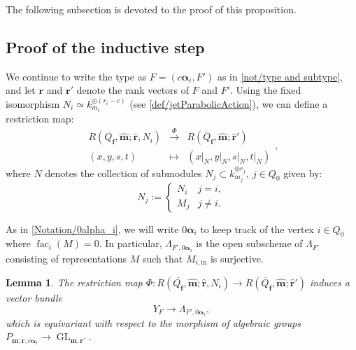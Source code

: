 \documentclass[a4paper,12pt]{article}
\theoremstyle{definition}
\theoremstyle{plain}
\newtheorem{lemma}[definition]{Lemma}
\theoremstyle{remark}
\DeclareMathOperator{\fac}{fac}
\DeclareMathOperator{\GL}{GL}
\newcommand\bfalpha{\bm{\alpha}}
\newcommand\bff{\mathbf{f}}
\newcommand\bfm{\mathbf{m}}
\newcommand\bfr{\mathbf{r}}
\begin{document}
The following subsection is devoted to the proof of this proposition.

\subsection{Proof of the inductive step}

We continue to write the type as $F = (c\bfalpha_i,F')$ as in \cref{not/type and subtype}, and let $\bfr$ and $\bfr'$ denote the rank vectors of $F$ and $F'$. Using the fixed isomorphism $N_i\simeq k_{m_i}^{\oplus (r_i-c)}$ (see \cref{def/jetParabolicAction}), we can define a restriction map:
\[
\begin{array}{rcl}
R(\overline{Q_\bff},\widehat{\bfm};\widehat{\bfr},N_i) &
\overset{\Phi}{\longrightarrow} &
R(\overline{Q}_\bff,\widehat{\bfm};\widehat{\bfr}') \\
(x,y,s,t) & \mapsto & (x\vert_N,y\vert_N,s\vert_N,t\vert_N)
\end{array}
,
\]
where $N$ denotes the collection of submodules $N_j\subset k_{m_j}^{\oplus r_j},\ j\in Q_0$ given by:
\[
N_j:=
\left\{
\begin{array}{ll}
N_i & j=i, \\
M_j & j\ne i.
\end{array}
\right.
\]

As in \cref{Notation/0alpha_i}, we will write $0\bfalpha_i$ to keep track of the vertex $i\in Q_0$ where $\fac_i(M)=0$. In particular, $\Lambda_{F',0\bfalpha_i}$ is the open subscheme of $\Lambda_{F'}$ consisting of representations $M$ such that $M_{i,\mathrm{in}}$ is surjective.

\begin{lemma}\label{Lem/extensionMap}
The restriction map $ \Phi \colon 
R(\overline{Q_\bff},\widehat{\bfm};\widehat{\bfr},N_i)
\longrightarrow
R(\overline{Q}_\bff,\widehat{\bfm};\widehat{\bfr}')$
induces a vector bundle
\[
Y_F\rightarrow\Lambda_{F',0\bfalpha_i},
\]
which is equivariant with respect to the morphism of algebraic groups $P_{\bfm;\bfr,c\bfalpha_i}\rightarrow\GL_{\bfm,\bfr'}$.
\end{lemma}
\end{document}
